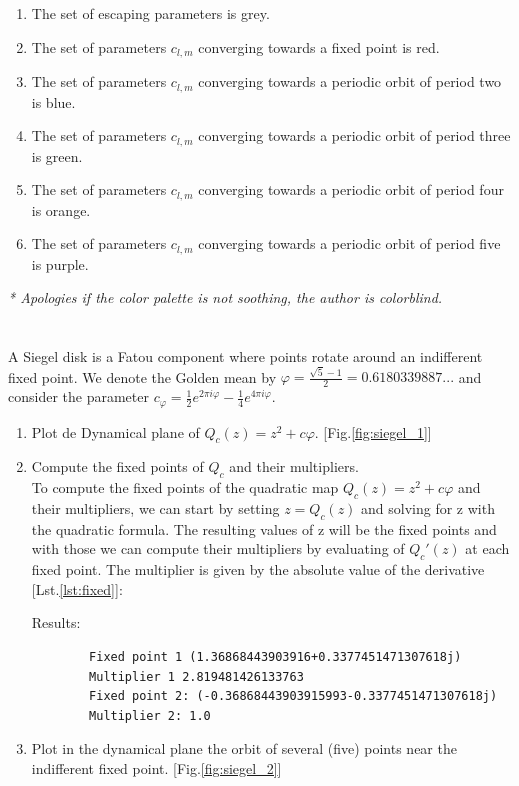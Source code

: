 \documentclass[11pt]{article}
\begin{document}
\begin{enumerate}[label=(\alph{*})]
    \item The set of escaping parameters is grey.
    \item The set of parameters $c_{l,m}$ converging towards a fixed point is red.
    \item The set of parameters $c_{l,m}$ converging towards a periodic orbit of period two is blue.
    \item The set of parameters $c_{l,m}$ converging towards a periodic orbit of period three is green.
    \item The set of parameters $c_{l,m}$ converging towards a periodic orbit of period four is orange.
    \item The set of parameters $c_{l,m}$ converging towards a periodic orbit of period five is purple.
\end{enumerate}

\textit{* Apologies if the color palette is not soothing, the author is colorblind.}

\newpage
\hypertarget{4}{%
\section{}\label{4}}
A Siegel disk is a Fatou component
where points rotate around an indifferent fixed point. We denote the Golden mean
by $\varphi = \frac{\sqrt{5} - 1}{2} = 0.6180339887...$ and consider the parameter 
$c_{\varphi} = \frac{1}{2}e^{2\pi i \varphi} - \frac{1}{4}e^{4\pi i \varphi}$.

\begin{enumerate}[label=(\alph{*})]
    \item Plot de Dynamical plane of $Q_c(z) = z^2 + c\varphi$. [Fig.\ref{fig:siegel_1}]
    \item Compute the fixed points of $Q_c$ and their multipliers.\\
    To compute the fixed points of the quadratic map $Q_c(z) = z^2 + c{\varphi}$ and their multipliers, we can start by setting $z = Q_c(z)$ and solving for z with the quadratic formula.
    The resulting values of z will be the fixed points and with those we can compute their multipliers by evaluating of $Q_c'(z)$ at each fixed point. The multiplier is given by the absolute value of the derivative [Lst.\ref{lst:fixed}]:
    
    Results:
    \begin{lstlisting}
        Fixed point 1 (1.36868443903916+0.3377451471307618j)
        Multiplier 1 2.819481426133763
        Fixed point 2: (-0.36868443903915993-0.3377451471307618j)
        Multiplier 2: 1.0
    \end{lstlisting}
    \item Plot in the dynamical plane the orbit of several (five) points near the indifferent fixed point. [Fig.\ref{fig:siegel_2}]
\end{enumerate}
\pagebreak

\end{document}
